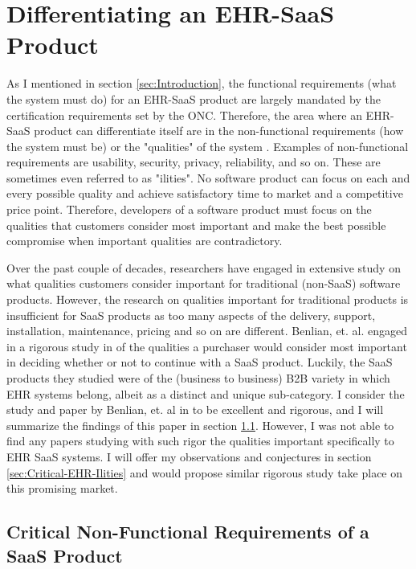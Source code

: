 \documentclass[10pt]{article}
\begin{document}
\section{Differentiating an EHR-SaaS Product}
\label{sec:Critical-EhrSaaS-Ilities}

As I mentioned in section \ref{sec:Introduction}, the functional requirements (what the system must do) for an EHR-SaaS product are largely mandated by the certification requirements set by the ONC.
Therefore, the area where an EHR-SaaS product can differentiate itself are in the non-functional requirements (how the system must be) or the "qualities" of the system \cite{wiki-nfr}.
Examples of non-functional requirements are usability, security, privacy, reliability, and so on.
These are sometimes even referred to as "ilities".
No software product can focus on each and every possible quality and achieve satisfactory time to market and a competitive price point.
Therefore, developers of a software product must focus on the qualities that customers consider most important and make the best possible compromise when important qualities are contradictory.

Over the past couple of decades, researchers have engaged in extensive study on what qualities customers consider important for traditional (non-SaaS) software products.
However, the research on qualities important for traditional products is insufficient for SaaS products as too many aspects of the delivery, support, installation, maintenance, pricing and so on are different.
Benlian, et. al. engaged in a rigorous study in \cite{saasqual} of the qualities a purchaser would consider most important in deciding whether or not to continue with a SaaS product.
Luckily, the SaaS products they studied were of the (business to business) B2B variety in which EHR systems belong, albeit as a distinct and unique sub-category. 
I consider the study and paper by Benlian, et. al in \cite{saasqual} to be excellent and rigorous, and I will summarize the findings of this paper in section \ref{sec:Critical-SaaS-Ilities}.
However, I was not able to find any papers studying with such rigor the qualities important specifically to EHR SaaS systems.
I will offer my observations and conjectures in section \ref{sec:Critical-EHR-Ilities} and would propose similar rigorous study take place on this promising market.

\subsection{Critical Non-Functional Requirements of a SaaS Product}
\label{sec:Critical-SaaS-Ilities}
\end{document}
